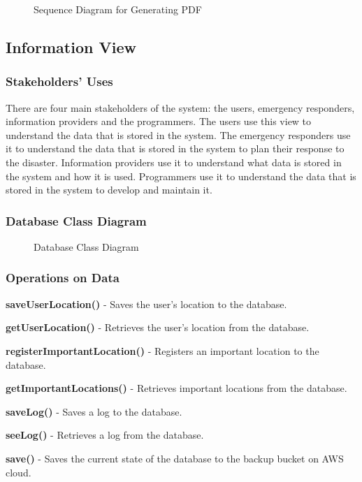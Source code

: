 \documentclass[a4paper]{article}
\begin{document}
    \begin{figure}
        
        \caption{Sequence Diagram for Generating PDF}
    \end{figure}

    \subsection{Information View}
    \subsubsection{Stakeholders' Uses}
    There are four main stakeholders of the system: the users, emergency responders, information providers and the programmers.
    The users use this view to understand the data that is stored in the system. The emergency responders use it to understand
    the data that is stored in the system to plan their response to the disaster. Information providers use it to understand
    what data is stored in the system and how it is used. Programmers use it to understand the data that is stored in the system
    to develop and maintain it.
    \subsubsection{Database Class Diagram}

    \begin{figure}
        
        \caption{Database Class Diagram}
    \end{figure}

    \subsubsection{Operations on Data}
    
    \begin{itemize*}
        \item \textbf{saveUserLocation()} - Saves the user's location to the database.
        \item \textbf{getUserLocation()} - Retrieves the user's location from the database.
        \item \textbf{registerImportantLocation()} - Registers an important location to the database.
        \item \textbf{getImportantLocations()} - Retrieves important locations from the database.
        \item \textbf{saveLog()} - Saves a log to the database.
        \item \textbf{seeLog()} - Retrieves a log from the database.
        \item \textbf{save()} - Saves the current state of the database to the backup bucket on AWS cloud.
    \end{itemize*}
\end{document}
